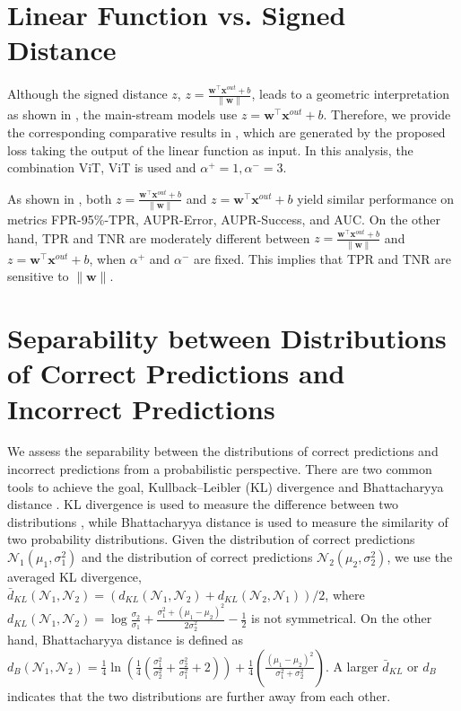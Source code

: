 % 

\section{Linear Function vs. Signed Distance}
\label{sec:appd_z}
Although the signed distance $z$, \ie $z = \frac{\bm{w}^{\top} \bm{x}^{out}+b}{\|\bm{w}\|}$, leads to a geometric interpretation as shown in , the main-stream models \cite{He_CVPR_2016,Tan_ICML_2019,Dosovitskiy_ICLR_2021} use $z=\bm{w}^{\top}\bm{x}^{out}+b$. 
Therefore, we provide the corresponding comparative results in , which are generated by the proposed loss taking the output of the linear function as input.
In this analysis, the combination \textlangle ViT, ViT \textrangle is used and $\alpha^{+}=1,\alpha^{-}=3$.

As shown in , both $z = \frac{\bm{w}^{\top} \bm{x}^{out}+b}{\|\bm{w}\|}$ and $z=\bm{w}^{\top}\bm{x}^{out}+b$ yield similar performance on metrics FPR-95\%-TPR, AUPR-Error, AUPR-Success, and AUC.
On the other hand, TPR and TNR are moderately different between $z = \frac{\bm{w}^{\top} \bm{x}^{out}+b}{\|\bm{w}\|}$ and $z=\bm{w}^{\top}\bm{x}^{out}+b$, when $\alpha^{+}$ and $\alpha^{-}$ are fixed.
This implies that TPR and TNR are sensitive to $\|\bm{w}\|$.



\section{Separability between Distributions of Correct Predictions and Incorrect Predictions}
\label{sec:separability}
We assess the separability between the distributions of correct predictions and incorrect predictions from a probabilistic perspective.
There are two common tools to achieve the goal, \ie Kullback–Leibler (KL) divergence \cite{Kullback_AMS_1951} and Bhattacharyya distance \cite{Bhattacharyya_JSTOR_1946}. KL divergence is used to measure the difference between two distributions \cite{Cantu_Springer_2004,Luo_TNNLS_2020}, while Bhattacharyya distance is used to measure the similarity of two probability distributions. Given the distribution of correct predictions $\mathcal{N}_{1}(\mu_{1}, \sigma^{2}_{1})$ and the distribution of correct predictions $\mathcal{N}_{2}(\mu_{2}, \sigma^{2}_{2})$, we use the averaged KL divergence, \ie $\bar{d}_{KL}(\mathcal{N}_{1}, \mathcal{N}_{2}) = (d_{KL}(\mathcal{N}_{1}, \mathcal{N}_{2}) + d_{KL}(\mathcal{N}_{2}, \mathcal{N}_{1}))/2$, where $d_{KL}(\mathcal{N}_{1}, \mathcal{N}_{2})=\log\frac{\sigma_{2}}{\sigma_{1}}+\frac{\sigma_{1}^{2}+(\mu_{1}-\mu_{2})^{2}}{2\sigma_{2}^{2}}-\frac{1}{2}$ is not symmetrical. On the other hand, Bhattacharyya distance is defined as $d_{B}(\mathcal{N}_{1}, \mathcal{N}_{2})=\frac{1}{4}\ln \left( \frac{1}{4} \left( \frac{\sigma^{2}_{1}}{\sigma^{2}_{2}}+\frac{\sigma^{2}_{2}}{\sigma^{2}_{1}}+2 \right) \right) + \frac{1}{4} \left( \frac{(\mu_{1}-\mu_{2})^{2}}{\sigma^{2}_{1}+\sigma^{2}_{2}} \right)$. A larger $\bar{d}_{KL}$ or $d_{B}$ indicates that the two distributions are further away from each other.

